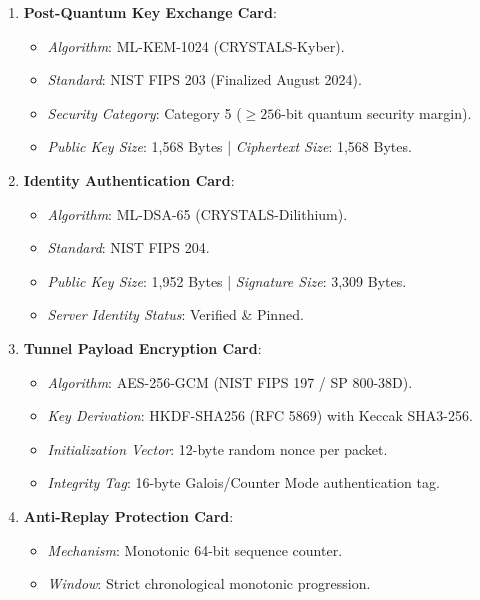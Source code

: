 \begin{enumerate}
    \item \textbf{Post-Quantum Key Exchange Card}:
    \begin{itemize}
        \item \textit{Algorithm}: ML-KEM-1024 (CRYSTALS-Kyber).
        \item \textit{Standard}: NIST FIPS 203 (Finalized August 2024).
        \item \textit{Security Category}: Category 5 ($\ge 256$-bit quantum security margin).
        \item \textit{Public Key Size}: 1,568 Bytes | \textit{Ciphertext Size}: 1,568 Bytes.
    \end{itemize}
    \item \textbf{Identity Authentication Card}:
    \begin{itemize}
        \item \textit{Algorithm}: ML-DSA-65 (CRYSTALS-Dilithium).
        \item \textit{Standard}: NIST FIPS 204.
        \item \textit{Public Key Size}: 1,952 Bytes | \textit{Signature Size}: 3,309 Bytes.
        \item \textit{Server Identity Status}: Verified \& Pinned.
    \end{itemize}
    \item \textbf{Tunnel Payload Encryption Card}:
    \begin{itemize}
        \item \textit{Algorithm}: AES-256-GCM (NIST FIPS 197 / SP 800-38D).
        \item \textit{Key Derivation}: HKDF-SHA256 (RFC 5869) with Keccak SHA3-256.
        \item \textit{Initialization Vector}: 12-byte random nonce per packet.
        \item \textit{Integrity Tag}: 16-byte Galois/Counter Mode authentication tag.
    \end{itemize}
    \item \textbf{Anti-Replay Protection Card}:
    \begin{itemize}
        \item \textit{Mechanism}: Monotonic 64-bit sequence counter.
        \item \textit{Window}: Strict chronological monotonic progression.
    \end{itemize}
\end{enumerate}

